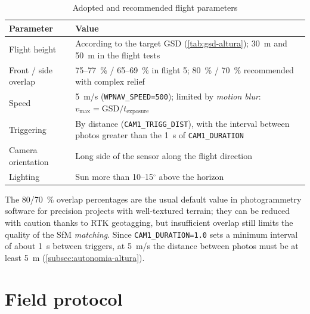 \begin{table}[H]
    \centering
    \caption{Adopted and recommended flight parameters}
    \label{tab:parametres-vol}
    \begin{tabular}{lP{9cm}}
        \toprule
        Parameter & Value \\
        \midrule
        Flight height & According to the target GSD (\cref{tab:gsd-altura}); 30~m and 50~m in the flight tests \\
        Front / side overlap & 75--77~\% / 65--69~\% in flight 5; 80~\% / 70~\% recommended with complex relief \\
        Speed & 5~m/s (\texttt{WPNAV\_SPEED=500}); limited by \emph{motion blur}: $v_{\max} = \mathrm{GSD}/t_{\text{exposure}}$ \\
        Triggering & By distance (\texttt{CAM1\_TRIGG\_DIST}), with the interval between photos greater than the 1~s of \texttt{CAM1\_DURATION} \\
        Camera orientation & Long side of the sensor along the flight direction \\
        Lighting & Sun more than 10--15$^{\circ}$ above the horizon \\
        \bottomrule
    \end{tabular}
\end{table}

The 80/70~\% overlap percentages are the usual default value in photogrammetry software for precision projects with well-textured terrain; they can be reduced with caution thanks to RTK geotagging, but insufficient overlap still limits the quality of the SfM \emph{matching}. Since \texttt{CAM1\_DURATION=1.0} sets a minimum interval of about 1~s between triggers, at 5~m/s the distance between photos must be at least 5~m (\cref{subsec:autonomia-altura}).

\section{Field protocol}
\label{sec:protocol-camp}

